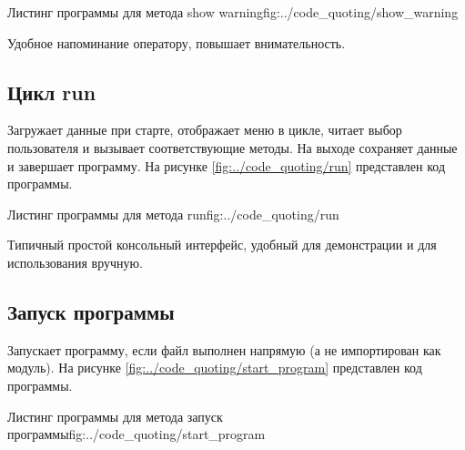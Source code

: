\documentclass{vvsu}
\begin{document}
\begin{vvsu_figure}{Листинг программы для метода show warning}{fig:../code_quoting/show_warning}
  \begin{minipage}{.75\textwidth}
    
  \end{minipage}
\end{vvsu_figure}

  Удобное напоминание оператору, повышает внимательность.


\subsection{Цикл run}
  Загружает данные при старте, отображает меню в цикле, читает выбор пользователя и вызывает соответствующие методы. На выходе сохраняет данные и завершает программу.
  На рисунке \ref{fig:../code_quoting/run} представлен код программы.

\begin{vvsu_figure}{Листинг программы для метода run}{fig:../code_quoting/run}
  \begin{minipage}{.75\textwidth}
    
  \end{minipage}
\end{vvsu_figure}

  Типичный простой консольный интерфейс, удобный для демонстрации и для использования вручную.


\subsection{Запуск программы}
  Запускает программу, если файл выполнен напрямую (а не импортирован как модуль).
  На рисунке \ref{fig:../code_quoting/start_program} представлен код программы.

\begin{vvsu_figure}{Листинг программы для метода запуск программы}{fig:../code_quoting/start_program}
  \begin{minipage}{.75\textwidth}
    
  \end{minipage}
\end{vvsu_figure}
\end{document}
